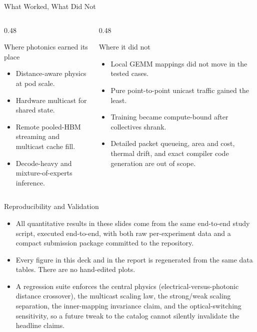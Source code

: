 \documentclass[10pt,aspectratio=169]{beamer}
\newenvironment{tightitemize}{\begin{itemize}\setlength{\itemsep}{4pt}\setlength{\parskip}{0pt}}{\end{itemize}}
\begin{document}
\begin{frame}{What Worked, What Did Not}
  \begin{columns}[T,onlytextwidth]
    \begin{column}{0.48\textwidth}
      \begin{block}{Where photonics earned its place}
      \begin{tightitemize}
        \item Distance-aware physics at pod scale.
        \item Hardware multicast for shared state.
        \item Remote pooled-HBM streaming and multicast cache fill.
        \item Decode-heavy and mixture-of-experts inference.
      \end{tightitemize}
      \end{block}
    \end{column}
    \begin{column}{0.48\textwidth}
      \begin{block}{Where it did not}
      \begin{tightitemize}
        \item Local GEMM mappings did not move in the tested cases.
        \item Pure point-to-point unicast traffic gained the least.
        \item Training became compute-bound after collectives shrank.
        \item Detailed packet queueing, area and cost, thermal drift, and exact compiler code generation are out of scope.
      \end{tightitemize}
      \end{block}
    \end{column}
  \end{columns}
\end{frame}

\begin{frame}{Reproducibility and Validation}
  \begin{tightitemize}
    \item All quantitative results in these slides come from the same end-to-end study script, executed end-to-end, with both raw per-experiment data and a compact submission package committed to the repository.
    \item Every figure in this deck and in the report is regenerated from the same data tables. There are no hand-edited plots.
    \item A regression suite enforces the central physics (electrical-versus-photonic distance crossover), the multicast scaling law, the strong/weak scaling separation, the inner-mapping invariance claim, and the optical-switching sensitivity, so a future tweak to the catalog cannot silently invalidate the headline claims.
  \end{tightitemize}
\end{frame}
\end{document}
